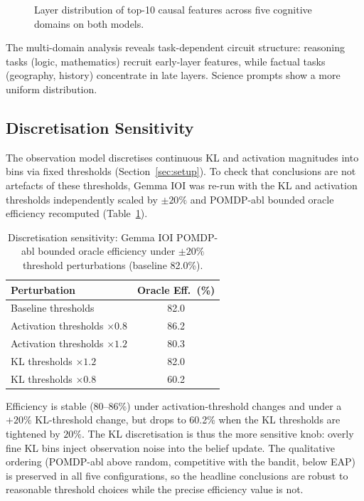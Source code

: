 \begin{figure}[H]
\centering

\caption{Layer distribution of top-10 causal features across five cognitive domains on both models.}
\label{fig:domain_layers}
\end{figure}

The multi-domain analysis reveals task-dependent circuit structure:
reasoning tasks (logic, mathematics) recruit early-layer features,
while factual tasks (geography, history) concentrate in late layers.
Science prompts show a more uniform distribution.


\subsection{Discretisation Sensitivity}
\label{sec:sensitivity}

The observation model discretises continuous KL and activation
magnitudes into bins via fixed thresholds (Section~\ref{sec:setup}).
To check that conclusions are not artefacts of these thresholds, Gemma
IOI was re-run with the KL and activation thresholds independently
scaled by $\pm 20\%$ and POMDP-abl bounded oracle
efficiency recomputed (Table~\ref{tab:sensitivity}).

\begin{table}[H]
\centering
\caption{Discretisation sensitivity: Gemma IOI POMDP-abl bounded
oracle efficiency under $\pm 20\%$ threshold perturbations
(baseline 82.0\%).}
\label{tab:sensitivity}
{\small
\begin{tabular}{lc}
\toprule
\textbf{Perturbation} & \textbf{Oracle Eff.\ (\%)} \\
\midrule
Baseline thresholds            & 82.0 \\
Activation thresholds $\times 0.8$ & 86.2 \\
Activation thresholds $\times 1.2$ & 80.3 \\
KL thresholds $\times 1.2$         & 82.0 \\
KL thresholds $\times 0.8$         & 60.2 \\
\bottomrule
\end{tabular}%
}
\end{table}

Efficiency is stable (80--86\%) under activation-threshold changes and
under a $+20\%$ KL-threshold change, but drops to 60.2\% when the KL
thresholds are tightened by $20\%$.  The KL discretisation is thus the
more sensitive knob: overly fine KL bins inject observation noise into
the belief update.  The qualitative ordering (POMDP-abl above random,
competitive with the bandit, below EAP) is preserved in all five
configurations, so the headline conclusions are robust to reasonable
threshold choices while the precise efficiency value is not.

